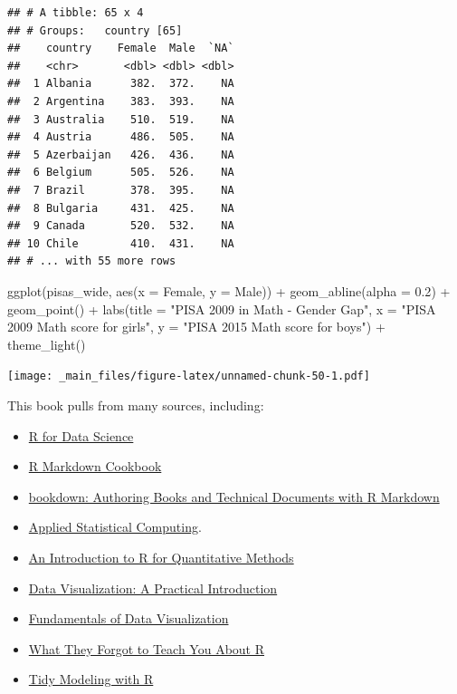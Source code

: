 \documentclass[
]{book}
\newenvironment{Shaded}{\begin{snugshade}}{\end{snugshade}}
\newcommand{\AttributeTok}[1]{\textcolor[rgb]{0.77,0.63,0.00}{#1}}
\newcommand{\FloatTok}[1]{\textcolor[rgb]{0.00,0.00,0.81}{#1}}
\newcommand{\FunctionTok}[1]{\textcolor[rgb]{0.00,0.00,0.00}{#1}}
\newcommand{\NormalTok}[1]{#1}
\newcommand{\SpecialCharTok}[1]{\textcolor[rgb]{0.00,0.00,0.00}{#1}}
\newcommand{\StringTok}[1]{\textcolor[rgb]{0.31,0.60,0.02}{#1}}
\begin{document}
\begin{verbatim}
## # A tibble: 65 x 4
## # Groups:   country [65]
##    country    Female  Male  `NA`
##    <chr>       <dbl> <dbl> <dbl>
##  1 Albania      382.  372.    NA
##  2 Argentina    383.  393.    NA
##  3 Australia    510.  519.    NA
##  4 Austria      486.  505.    NA
##  5 Azerbaijan   426.  436.    NA
##  6 Belgium      505.  526.    NA
##  7 Brazil       378.  395.    NA
##  8 Bulgaria     431.  425.    NA
##  9 Canada       520.  532.    NA
## 10 Chile        410.  431.    NA
## # ... with 55 more rows
\end{verbatim}

\begin{Shaded}
\begin{Highlighting}[]
\FunctionTok{ggplot}\NormalTok{(pisas\_wide, }\FunctionTok{aes}\NormalTok{(}\AttributeTok{x =}\NormalTok{ Female, }\AttributeTok{y =}\NormalTok{ Male)) }\SpecialCharTok{+}
  \FunctionTok{geom\_abline}\NormalTok{(}\AttributeTok{alpha =} \FloatTok{0.2}\NormalTok{) }\SpecialCharTok{+}
  \FunctionTok{geom\_point}\NormalTok{() }\SpecialCharTok{+}
  \FunctionTok{labs}\NormalTok{(}\AttributeTok{title =} \StringTok{"PISA 2009 in Math {-} Gender Gap"}\NormalTok{,}
       \AttributeTok{x =} \StringTok{"PISA 2009 Math score for girls"}\NormalTok{,}
       \AttributeTok{y =} \StringTok{"PISA 2015 Math score for boys"}\NormalTok{) }\SpecialCharTok{+}
  \FunctionTok{theme\_light}\NormalTok{()}
\end{Highlighting}
\end{Shaded}

\texttt{[image: \_main\_files/figure-latex/unnamed-chunk-50-1.pdf]}

This book pulls from many sources, including:

\begin{itemize}
\item
  \href{https://r4ds.had.co.nz/}{R for Data Science}
\item
  \href{https://bookdown.org/yihui/rmarkdown-cookbook/}{R Markdown Cookbook}
\item
  \href{https://bookdown.org/yihui/bookdown/}{bookdown: Authoring Books and Technical Documents with R Markdown}
\item
  \href{https://stat480-at-isu.github.io/schedule.html}{Applied Statistical Computing}.
\item
  \href{https://people.stat.sc.edu/habing/RforQM/RforQM.htm}{An Introduction to R for Quantitative Methods}
\item
  \href{https://socviz.co/}{Data Visualization: A Practical Introduction}
\item
  \href{https://clauswilke.com/dataviz/index.html}{Fundamentals of Data Visualization}
\item
  \href{https://rstats.wtf/}{What They Forgot to Teach You About R}
\item
  \href{https://www.tmwr.org/}{Tidy Modeling with R}
\end{itemize}
\end{document}
